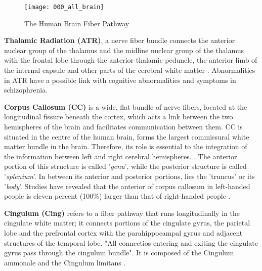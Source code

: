 \documentclass[../structure.tex]{subfiles}
\begin{document}
	\begin{figure}[h!]
	\centering
	\texttt{[image: 000\_all\_brain]}
	\captionsetup{justification=centering}
	\caption{The Human Brain Fiber Pathway}
	\label{fig:all_brain}
	\end{figure}
	
	\textbf{Thalamic Radiation (ATR)}, a nerve fiber bundle connects the anterior nuclear group of the thalamus and the midline nuclear group of the thalamus with the frontal lobe through the anterior thalamic peduncle, the anterior limb of the internal capsule and other parts of the cerebral white matter \cite{Washington1994}\cite{Grimm2018}. Abnormalities in ATR have a possible link with cognitive abnormalities and symptoms in schizophrenia\cite{Mamah2010}.		
		
		\textbf{Corpus Callosum (CC)} is a wide, flat bundle of nerve fibers, located at the longitudinal fissure beneath the cortex, which acts a link between the two hemispheres of the brain and facilitates communication between them. CC is situated in the centre of the human brain, forms the largest commissural white matter bundle in the brain. Therefore, its role is essential to the integration of the information between left and right cerebral hemispheres. \cite{Fitsiori2011}.
The anterior portion of this structure is called '\textit{genu}', while the posterior structure is called '\textit{splenium}'. In between its anterior and posterior portions, lies the 'truncus' or its '\textit{body}'. Studies have revealed that the anterior of corpus callosum in left-handed people is eleven percent (100\%) larger than that of right-handed people \cite{PDD2015}. 


		\textbf{Cingulum (Cing)}
		refers to a fiber pathway that runs longitudinally in the cingulate white matter; it connects portions of the cingulate gyrus, the parietal lobe and the prefrontal cortex with the parahippocampal gyrus and adjacent structures of the temporal lobe. "All connectios entering and exiting the cingulate gyrus pass through the cingulum bundle". It is composed of the Cingulum ammonale and the Cingulum limitans \cite{Washington1994}.\\
		
\end{document}
